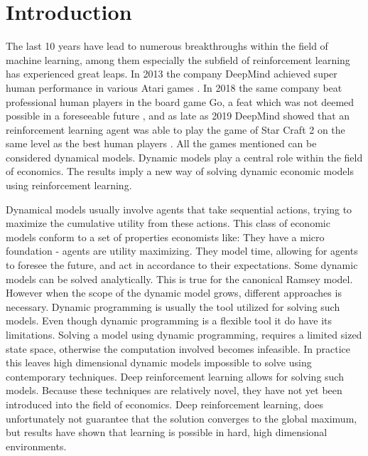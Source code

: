 \section{Introduction} 

The last 10 years have lead to numerous breakthroughs within the field of machine learning, among them especially the subfield of reinforcement learning has experienced great leaps. In 2013 the company DeepMind achieved super human performance in various Atari games \parencite{mnih_playing_2013}. In 2018 the same company beat professional human players in the board game Go, a feat which was not deemed possible in a foreseeable future \parencite{silver_general_2018}, and as late as 2019 DeepMind showed that an reinforcement learning agent was able to play the game of Star Craft 2 on the same level as the best human players \parencite{vinyals_grandmaster_2019}. All the games mentioned can be considered dynamical models. Dynamic models play a central role within the field of economics. The results imply a new way of solving dynamic economic models using reinforcement learning.

Dynamical models usually involve agents that take sequential actions, trying to maximize the cumulative utility from these actions. This class of economic models conform to a set of properties economists like: They have a micro foundation - agents are utility maximizing. They model time, allowing for agents to foresee the future, and act in accordance to their expectations. Some dynamic models can be solved  analytically. This is true for the canonical Ramsey model. However when the scope of the dynamic model grows, different approaches is necessary. Dynamic programming is usually the tool utilized for solving such models.  Even though dynamic programming is a flexible tool it do have its limitations. Solving a model using dynamic programming, requires a limited sized state space, otherwise the computation involved becomes infeasible. In practice this leaves high dimensional dynamic models impossible to solve using contemporary techniques. Deep reinforcement learning allows for solving such models. Because these techniques are relatively novel, they have not yet been introduced into the field of economics. Deep reinforcement learning, does unfortunately not guarantee that the solution converges to the global maximum, but results have shown that learning is possible in hard, high dimensional environments.

